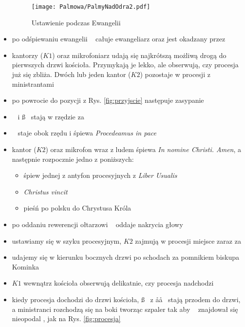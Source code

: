 \begin{itemize}
	      \begin{figure}[h!]
		      \centering
		      \texttt{[image: Palmowa/PalmyNadOdra2.pdf]}
		      \caption{Ustawienie podczas Ewangelii}
		      \label{fig:ewangelia}
	      \end{figure}

	\item po odśpiewaniu ewangelii \ii~ całuje ewangeliarz oraz jest okadzany
	      przez \dd
	\item kantorzy ($K1$) oraz mikrofoniarz udają się najkrótszą możliwą drogą
	      do pierwszych drzwi kościoła. Przymykają je lekko, ale obserwują, czy
	      procesja już się zbliża. Dwóch lub jeden kantor ($K2$) pozostaje w
	      procesji z ministrantami
	\item po powrocie do pozycji z Rys. \ref{fig:przyjscie} następuje zasypanie
	\item \dd~ i \ss~ stają w rzędzie za \ii
	\item \dd~ staje obok rzędu i śpiewa \textit{Procedeamus in pace}
	\item kantor ($K2$) oraz mikrofon wraz z ludem śpiewa \textit{In nomine
		      Christi. Amen}, a następnie rozpocznie jedno z poniższych:

	      \begin{itemize}
		      \item śpiew jednej z antyfon procesyjnych z \textit{Liber
			            Usualis}
		      \item \textit{Christus vincit}
		      \item pieśń po polsku do Chrystusa Króla
	      \end{itemize}

	\item po oddaniu rewerencji ołtarzowi \cc~ oddaje nakrycia głowy
	\item ustawiamy się w szyku procesyjnym, $K2$ zajmują w procesji miejsce
	      zaraz za 
	\item udajemy się w kierunku bocznych drzwi po schodach za pomnikiem biskupa
	      Kominka
	\item $K1$ wewnątrz kościoła obserwują delikatnie, czy procesja nadchodzi
	\item kiedy procesja dochodzi do drzwi kościoła, \ss~ z \aa\aa~ stają przodem
	      do drzwi, a ministranci rozchodzą się na boki tworząc szpaler tak aby
	      \ii~ znajdował się nieopodal , jak na Rys. \ref{fig:procesja}

	      \medskip


\end{itemize}
